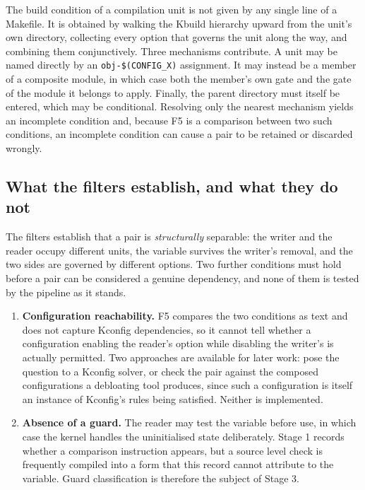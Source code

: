 \documentclass[12pt, a4paper, oneside]{book}
\begin{document}
The build condition of a compilation unit is not given by any single line of a
Makefile. It is obtained by walking the Kbuild hierarchy upward from the unit's
own directory, collecting every option that governs the unit along the way, and
combining them conjunctively. Three mechanisms contribute. A unit may be named
directly by an \texttt{obj-\$(CONFIG\_X)} assignment. It may instead be a member
of a composite module, in which case both the member's own gate and the gate of
the module it belongs to apply. Finally, the parent directory must itself be
entered, which may be conditional. Resolving only the nearest mechanism yields an
incomplete condition and, because F5 is a comparison between two such conditions,
an incomplete condition can cause a pair to be retained or discarded wrongly.

\subsection{What the filters establish, and what they do not}

The filters establish that a pair is \emph{structurally} separable: the writer and
the reader occupy different units, the variable survives the writer's removal, and
the two sides are governed by different options. Two further conditions must
hold before a pair can be considered a genuine dependency, and none of them is
tested by the pipeline as it stands.

\begin{enumerate}[leftmargin=*, label=\textbf{(\roman*)}]
  \item \textbf{Configuration reachability.} F5 compares the two conditions as
        text and does not capture Kconfig dependencies, so it cannot tell whether
        a configuration enabling the reader's option while disabling the writer's
        is actually permitted. Two approaches are available for later work: pose
        the question to a Kconfig solver, or check the pair against the composed
        configurations a debloating tool produces, since such a configuration is
        itself an instance of Kconfig's rules being satisfied. Neither is
        implemented.
  \item \textbf{Absence of a guard.} The reader may test the variable before use,
        in which case the kernel handles the uninitialised state deliberately.
        Stage 1 records whether a comparison instruction appears, but a source
        level check is frequently compiled into a form that this record cannot
        attribute to the variable. Guard classification is therefore the subject
        of Stage 3.
\end{enumerate}
\end{document}
